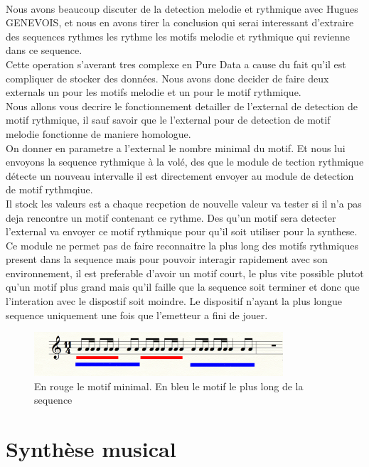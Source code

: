 \documentclass[a4paper, titlepage, oneside, 12pt]{article}%
\begin{document}
\paragraph{}
Nous avons beaucoup discuter de la detection melodie et rythmique avec Hugues GENEVOIS, et nous en avons tirer la conclusion qui serai interessant d'extraire des sequences rythmes les rythme les motifs melodie et rythmique qui revienne dans ce sequence.\\
Cette operation s'averant tres complexe en Pure Data a cause du fait qu'il est compliquer de stocker des données. Nous avons donc decider de faire deux externals un pour les motifs melodie et un pour le motif rythmique.\\
Nous allons vous decrire le fonctionnement detailler de l'external de detection de motif rythmique, il sauf savoir que le l'external pour de detection de motif melodie fonctionne de maniere homologue.\\
On donner en parametre a l'external le nombre minimal du motif. Et nous lui envoyons la sequence rythmique à la volé, des que le module de tection rythmique détecte un nouveau intervalle il est directement envoyer au module de detection de motif rythmqiue.\\
Il stock les valeurs est a chaque recpetion de nouvelle valeur va tester si il n'a pas deja rencontre un motif contenant ce rythme. Des qu'un motif sera detecter l'external va envoyer ce motif rythmique pour qu'il soit utiliser pour la synthese.\\
Ce module ne permet pas de faire reconnaitre la plus long des motifs rythmiques present dans la sequence mais pour pouvoir interagir rapidement avec son environnement, il est preferable d'avoir un motif court, le plus vite possible plutot qu'un motif plus grand mais qu'il faille que la sequence soit terminer et donc que l'interation avec le dispostif soit moindre. Le dispositif n'ayant la plus longue sequence uniquement une fois que l'emetteur a fini de jouer.
\begin{figure}[H]
	\centering
	\includegraphics[width=350px]{motifrythme.jpg}
	\caption{En rouge le motif minimal. En bleu le motif le plus long de la sequence}
\end{figure}
\section{Synthèse musical}
\end{document}
